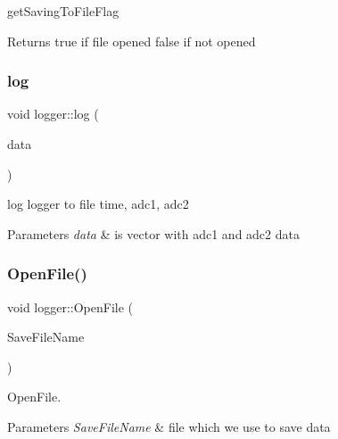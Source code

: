 get\+Saving\+To\+File\+Flag 

\begin{DoxyReturn}{Returns}
true if file opened false if not opened 
\end{DoxyReturn}
\mbox{\label{classlogger_abfe4ff2446577ad695e9fed3fb3aec52}} 
\subsubsection{\texorpdfstring{log}{log}}
{\footnotesize\ttfamily void logger\+::log (\begin{DoxyParamCaption}\item[{Q\+Vector$<$ int $>$}]{data }\end{DoxyParamCaption})\hspace{0.3cm}{\ttfamily [slot]}}



log logger to file time, adc1, adc2 


\begin{DoxyParams}{Parameters}
{\em data} & is vector with adc1 and adc2 data \\
\hline
\end{DoxyParams}
\mbox{\label{classlogger_aa50d85f779b5f28f67dab8ab6a215ad8}} 
\subsubsection{\texorpdfstring{Open\+File()}{OpenFile()}}
{\footnotesize\ttfamily void logger\+::\+Open\+File (\begin{DoxyParamCaption}\item[{Q\+String}]{Save\+File\+Name }\end{DoxyParamCaption})}



Open\+File. 


\begin{DoxyParams}{Parameters}
{\em Save\+File\+Name} & file which we use to save data \\
\hline
\end{DoxyParams}
\mbox{\label{classlogger_a6061365f51872f2f269568a8243dc284}} 
